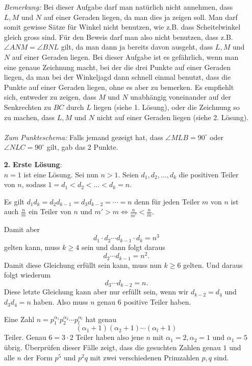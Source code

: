 \documentclass[12pt,a4paper]{article}
\theoremstyle{plain}
\theoremstyle{definition}
\theoremstyle{remark}
\begin{document}
\begin{enumerate}
\emph{Bemerkung:} Bei dieser Aufgabe darf man natürlich nicht annehmen, dass $L, M$ und $N$ auf einer Geraden liegen, da man dies ja zeigen soll. Man darf somit gewisse Sätze für Winkel nicht benutzen, wie z.B. dass Scheitelwinkel gleich gross sind. Für den Beweis darf man also nicht benutzen, dass z.B. $\angle ANM=\angle BNL$ gilt, da man dann ja bereits davon ausgeht, dass $L, M$ und $N$ auf einer Geraden liegen. Bei dieser Aufgabe ist es gefährlich, wenn man eine genaue Zeichnung macht, bei der die drei Punkte auf einer Geraden liegen, da man bei der Winkeljagd dann schnell einmal benutzt, dass die Punkte auf einer Geraden liegen, ohne es aber zu bemerken. Es empfiehlt sich, entweder zu zeigen, dass $M$ und $N$ unabhängig voneinander auf der Senkrechten zu $BC$ durch $L$ liegen (siehe 1. Lösung), oder die Zeichnung so zu machen, dass $L, M$ und $N$ nicht auf einer Geraden liegen (siehe 2. Lösung).\\
\\
\emph{Zum Punkteschema:} Falls jemand gezeigt hat, dass $\angle MLB=90^\circ$ oder $\angle NLC=90^\circ$ gilt, gab das 2 Punkte.\\

\bigskip



\item[\textbf{2.}]\textbf{Erste Lösung}:\\
$n=1$ ist eine Lösung. Sei nun $n>1$. Seien $d_1, d_2, \ldots, d_k$ die positiven Teiler von $n$, sodass $1= d_1 < d_2 < \ldots < d_k = n$. 

Es gilt $d_1 d_k = d_2  d_{k-1} = d_3 d_{k-2} = \cdots = n$ denn für jeden Teiler $m$ von $n$ ist auch $\frac{n}{m}$ ein Teiler von $n$ und $m'> m \Leftrightarrow \frac{n}{m'}< \frac{n}{m}$.

Damit aber
$$
	d_1 \cdot d_2 \cdots d_{k-1} \cdot d_k = n^3
$$
gelten kann, muss $k\geq 4$ sein und dann folgt daraus
$$
	d_2 \cdots d_{k-1} = n^2.
$$
Damit diese Gleichung erfüllt sein kann, muss nun $k\geq 6$ gelten. Und daraus folgt wiederum
$$
	d_3 \cdots d_{k-2} = n.
$$
Diese letzte Gleichung kann aber nur erfüllt sein, wenn wir $d_{k-2} = d_4$ und $d_3 d_4 = n$ haben. Also muss $n$ genau $6$ positive Teiler haben. 

Eine Zahl $n = p_1^{\alpha_1} p_2^{\alpha_2} \cdots p_l^{\alpha_l}$ hat genau 
$$
	(\alpha_1 +1)(\alpha_2+1)\cdots (\alpha_l +1)
$$
Teiler. Genau $6 = 3\cdot 2$ Teiler haben also jene $n$ mit $\alpha_1 = 2, \alpha_2 = 1$ und $\alpha_1 = 5$ übrig. Überprüfen dieser Fälle zeigt, dass die gesuchten Zahlen genau $1$ und alle $n$ der Form $p^5$ und $p^2q$ mit zwei verschiedenen Primzahlen $p,q$ sind.\\


\end{enumerate}
\end{document}
